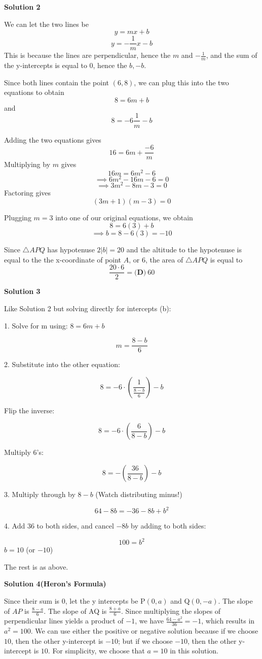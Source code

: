 \begin{enumerate}
\textbf{Solution 2}

We can let the two lines be 
 \[y=mx+b\] 
 \[y=-\frac{1}{m}x-b\] This is because the lines are perpendicular, hence the $m$ and $-\frac{1}{m}$, and the sum of the y-intercepts is equal to 0, hence the $b, -b$. 

 Since both lines contain the point $(6,8)$, we can plug this into the two equations to obtain 
 \[8=6m+b\] and 
 \[8=-6\frac{1}{m}-b\]

 Adding the two equations gives 
 \[16=6m+\frac{-6}{m}\] Multiplying by $m$ gives 
 \[16m=6m^2-6\] 
 \[\implies 6m^2-16m-6=0\] 
 \[\implies 3m^2-8m-3=0\] Factoring gives 
 \[(3m+1)(m-3)=0\] 

 Plugging $m=3$ into one of our original equations, we obtain 
 \[8=6(3)+b\] 
 \[\implies b=8-6(3)=-10\]

 Since $\bigtriangleup APQ$ has hypotenuse $2|b|=20$ and the altitude to the hypotenuse is equal to the the x-coordinate of point $A$, or 6, the area of $\bigtriangleup APQ$ is equal to 
 \[\frac{20\cdot6}{2}=\boxed{\textbf{(D)}\ 60}\]




\textbf{Solution 3}

Like Solution 2 but solving directly for intercepts (b):

 1. Solve for m using: $8=6m+b$

 \[m=\frac{8-b}{6}\]

 2. Substitute into the other equation:

 
 \[8=-6\cdot(\frac{1}{\frac{8-b}{6}})-b\]

 Flip the inverse:

 
 \[8=-6\cdot(\frac{6}{8-b})-b\]

 Multiply $6$'s:

 
 \[8=-(\frac{36}{8-b})-b\]

 
3. Multiply through by $8-b$ (Watch distributing minus!)

 
 \[64-8b=-36-8b+b^2\]

 4. Add $36$ to both sides, and cancel $-8b$ by adding to both sides:

 
 \[100=b^2\]
$b=10$ (or $-10$)

 The rest is as above.

 


 



\textbf{Solution 4(Heron's Formula)}

Since their sum is $0$, let the y intercepts be P$(0,a)$ and Q$(0,-a)$. The slope of $AP$ is $\frac{8-a}{6}$. The slope of AQ is $\frac{8+a}{6}$. Since multiplying the slopes of perpendicular lines yields a product of $-1$, we have $\frac{64-a^2}{36}=-1$, which results in $a^2=100$. We can use either the positive or negative solution because if we choose $10$, then the other y-intercept is $-10$; but if we choose $-10$, then the other y-intercept is $10$. For simplicity, we choose that $a=10$ in this solution. 


\end{enumerate}
